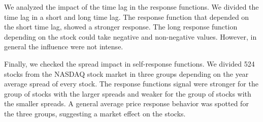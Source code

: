 We analyzed the impact of the time lag in the response functions. We divided
the time lag in a short and long time lag. The response function that depended
on the short time lag, showed a stronger response. The long response function
depending on the stock could take negative and non-negative values. However, in
general the influence were not intense.

Finally, we checked the spread impact in self-response functions. We divided
524 stocks from the NASDAQ stock market in three groups depending on the year
average spread of every stock. The response functions signal were stronger for
the group of stocks with the larger spreads and weaker for the group of stocks
with the smaller spreads. A general average price response behavior was spotted
for the three groups, suggesting a market effect on the stocks.